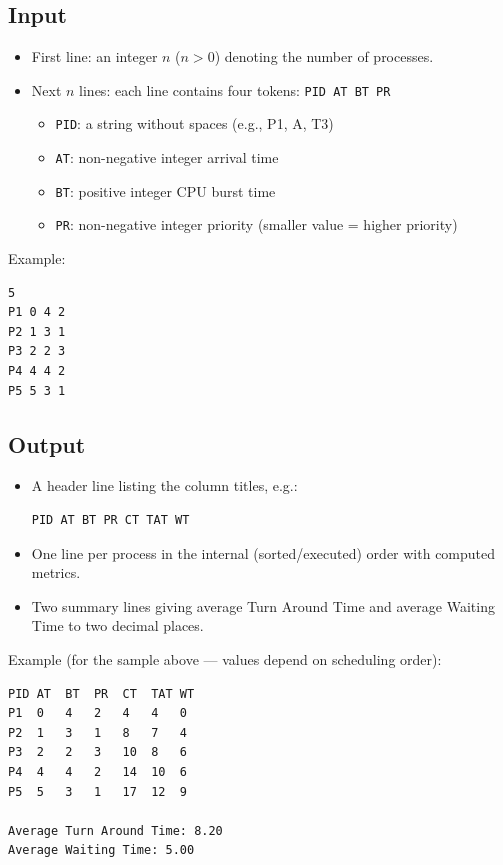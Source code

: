 \documentclass[12pt,a4paper]{article}
\begin{document}
\subsection*{Input}
\begin{itemize}
  \item First line: an integer $n$ ($n>0$) denoting the number of processes.
  \item Next $n$ lines: each line contains four tokens: \texttt{PID AT BT PR}
  \begin{itemize}
    \item \texttt{PID}: a string without spaces (e.g., P1, A, T3)
    \item \texttt{AT}: non-negative integer arrival time
    \item \texttt{BT}: positive integer CPU burst time
    \item \texttt{PR}: non-negative integer priority (smaller value = higher priority)
  \end{itemize}
\end{itemize}

Example:
\begin{verbatim}
5
P1 0 4 2
P2 1 3 1
P3 2 2 3
P4 4 4 2
P5 5 3 1
\end{verbatim}

\subsection*{Output}
\begin{itemize}
  \item A header line listing the column titles, e.g.:
\begin{verbatim}
PID AT BT PR CT TAT WT
\end{verbatim}
  \item One line per process in the internal (sorted/executed) order with computed metrics.
  \item Two summary lines giving average Turn Around Time and average Waiting Time to two decimal places.
\end{itemize}

Example (for the sample above --- values depend on scheduling order):
\begin{verbatim}
PID	AT	BT	PR	CT	TAT	WT
P1	0	4	2	4	4	0
P2	1	3	1	8	7	4
P3	2	2	3	10	8	6
P4	4	4	2	14	10	6
P5	5	3	1	17	12	9

Average Turn Around Time: 8.20
Average Waiting Time: 5.00
\end{verbatim}
\end{document}
